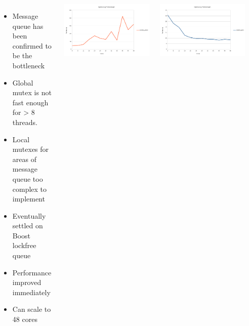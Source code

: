 \documentclass[25pt, portrait,  margin=0mm, innermargin=15mm,
  blockverticalspace=15mm, colspace=15mm, subcolspace=8mm]{tikzposter}
\begin{document}
\begin{columns}
{    }


     {
      \begin{itemize}
      \item Message queue has been confirmed to be the bottleneck
      \item Global mutex is not fast enough for > 8 threads.
      \item Local mutexes for areas of message queue too complex to implement
      \item Eventually settled on Boost lockfree queue
      \item Performance improved immediately
      \item Can scale to 48 cores
      \end{itemize}
      \begin{tikzfigure}
        \includegraphics[width=0.95\linewidth]{before.png}
      \end{tikzfigure}
            \begin{tikzfigure}
        \includegraphics[width=0.95\linewidth]{after.png}
      \end{tikzfigure}


}
\end{columns}
\end{document}
